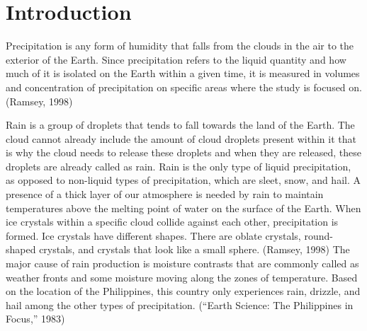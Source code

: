 \chapter{Introduction}





	Precipitation is any form of humidity that falls from the clouds in the air to the exterior of the Earth. Since precipitation refers to the liquid quantity and how much of it is isolated on the Earth within a given time, it is measured in volumes and concentration of precipitation on specific areas where the study is focused on. (Ramsey, 1998)
	
	Rain is a group of droplets that tends to fall towards the land of the Earth. The cloud cannot already include the amount of cloud droplets present within it that is why the cloud needs to release these droplets and when they are released, these droplets are already called as rain. Rain is the only type of liquid precipitation, as opposed to non-liquid types of precipitation, which are sleet, snow, and hail. A presence of a thick layer of our atmosphere is needed by rain to maintain temperatures above the melting point of water on the surface of the Earth. When ice crystals within a specific cloud collide against each other, precipitation is formed. Ice crystals have different shapes. There are oblate crystals, round-shaped crystals, and crystals that look like a small sphere. 
(Ramsey, 1998) The major cause of rain production is moisture contrasts that are commonly called as weather fronts and some moisture moving along the zones of temperature. Based on the location of the Philippines, this country only experiences rain, drizzle, and hail among the other types of precipitation. (“Earth Science: The Philippines in Focus,” 1983)

